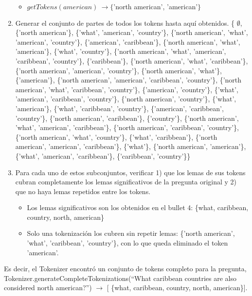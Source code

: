 \begin{enumerate}
\begin{itemize}
    \item $getTokens(american)\ \rightarrow \{$'north american', 'american'$\}$
  \end{itemize}
  \item Generar el conjunto de partes de todos los tokens hasta aquí obtenidos.
  \newline
   \{ $\emptyset$, \{'north american'\}, \{'what', 'american', 'country'\}, \{'north american', 'what', 'american', 'country'\}, \{'american', 'caribbean'\}, \{'north american', 'what', 'american'\}, \{'what', 'country'\}, \{'north american', 'what', 'american', 'caribbean', 'country'\}, \{'caribbean'\}, \{'north american', 'what', 'caribbean'\}, \{'north american', 'american', 'country'\}, \{'north american', 'what'\}, \{'american'\}, \{'north american', 'american', 'caribbean', 'country'\}, \{'north american', 'what', 'caribbean', 'country'\}, \{'american', 'country'\}, \{'what', 'american', 'caribbean', 'country'\}, \{'north american', 'country'\}, \{'what', 'american'\}, \{'what', 'caribbean', 'country'\}, \{'american', 'caribbean', 'country'\}, \{'north american', 'caribbean'\}, \{'country'\}, \{'north american', 'what', 'american', 'caribbean'\}, \{'north american', 'caribbean', 'country'\}, \{'north american', 'what', 'country'\}, \{'what', 'caribbean'\}, \{'north american', 'american', 'caribbean'\}, \{'what'\}, \{'north american', 'american'\}, \{'what', 'american', 'caribbean'\}, \{'caribbean', 'country'\}\}
  \item Para cada uno de estos subconjuntos, verificar 1) que los lemas de sus tokens cubran completamente
los lemas significativos de la pregunta original y 2) que no haya lemas repetidos
entre los tokens.
  \begin{itemize}
    \item Los lemas significativos son los obtenidos en el bullet 4: \{what, caribbean, country, north, american\}
    \item Solo una tokenización los cubren sin repetir lemas: \{'north american', 'what', 'caribbean', 'country'\}, con lo que queda eliminado el token 'american'.
  \end{itemize}
\end{enumerate}

Es decir, el Tokenizer encontró un conjunto de tokens completo para la pregunta, Tokenizer.generateCompleteTokenizations(``What caribbean countries are also considered north american?'') $\rightarrow$ [ \{what, caribbean, country, north, american\}].

